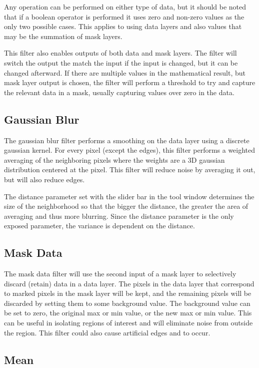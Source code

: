 \documentclass[fleqn,11pt,openany]{book}
\begin{document}
Any operation can be performed on either type of data, but it should be noted that if a boolean operator is performed it uses zero and non-zero values as the only two possible cases.  This applies to using data layers and also values that may be the summation of mask layers.  

This filter also enables outputs of both data and mask layers.  The filter will switch the output the match the input if the input is changed, but it can be changed afterward.  If there are multiple values in the mathematical result, but mask layer output is chosen, the filter will perform a threshold to try and capture the relevant data in a mask, usually capturing values over zero in the data. 

\subsection{Gaussian Blur}
\label{sec:gaussianblur}

The gaussian blur filter performs a smoothing on the data layer using a discrete gaussian kernel.  For every pixel (except the edges), this filter performs a weighted averaging of the neighboring pixels where the weights are a 3D gaussian distribution centered at the pixel.  This filter will reduce noise by averaging it out, but will also reduce edges.  

The distance parameter set with the slider bar in the tool window determines the size of the neighborhood so that the bigger the distance, the greater the area of averaging and thus more blurring.  Since the distance parameter is the only exposed parameter, the variance is dependent on the distance.

\subsection{Mask Data}

The mask data filter will use the second input of a mask layer to selectively discard (retain) data in a data layer.  The pixels in the data layer that correspond to marked pixels in the mask layer will be kept, and the remaining pixels will be discarded by setting them to some background value.  The background value can be set to zero, the original max or min value, or the new max or min value.  This can be useful in isolating regions of interest and will eliminate noise from outside the region.  This filter could also cause artificial edges and to occur.

\subsection{Mean}\
\end{document}
